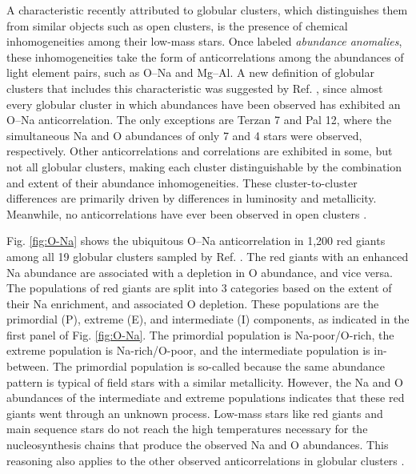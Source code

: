 A characteristic recently attributed to globular clusters, which distinguishes them from similar objects such as open clusters, is the presence of chemical inhomogeneities among their low-mass stars. Once labeled \emph{abundance anomalies}, these inhomogeneities take the form of anticorrelations among the abundances of light element pairs, such as O--Na and Mg--Al. A new definition of globular clusters that includes this characteristic was suggested by Ref. \cite{Carretta2010}, since almost every globular cluster in which abundances have been observed has exhibited an O--Na anticorrelation. 
The only exceptions are Terzan 7 and Pal 12, where the simultaneous Na and O abundances of only 7 \cite{Sbordone2007} and 4 \cite{Cohen2004} stars were observed, respectively. Other anticorrelations and correlations are exhibited in some, but not all globular clusters, making each cluster distinguishable by the combination and extent of their abundance inhomogeneities. These cluster-to-cluster differences are primarily driven by differences in luminosity and metallicity. Meanwhile, no anticorrelations have ever been observed in open clusters \cite{Gratton2019}.

Fig. \ref{fig:O-Na} shows the ubiquitous O--Na anticorrelation in 1,200 red giants among all 19 globular clusters sampled by Ref. \cite{Carretta2010}. The red giants with an enhanced Na abundance are associated with a depletion in O abundance, and vice versa. The populations of red giants are split into 3 categories based on the extent of their Na enrichment, and associated O depletion. These populations are the primordial (P), extreme (E), and intermediate (I) components, as indicated in the first panel of Fig. \ref{fig:O-Na}. The primordial population is Na-poor/O-rich, the extreme population is Na-rich/O-poor, and the intermediate population is in-between. The primordial population is so-called because the same abundance pattern is typical of field stars with a similar metallicity. However, the Na and O abundances of the intermediate and extreme populations indicates that these red giants went through an unknown process. Low-mass stars like red giants and main sequence stars do not reach the high temperatures necessary for the nucleosynthesis chains that produce the observed Na and O abundances. This reasoning also applies to the other observed anticorrelations in globular clusters \cite{Prantzos2007}.

